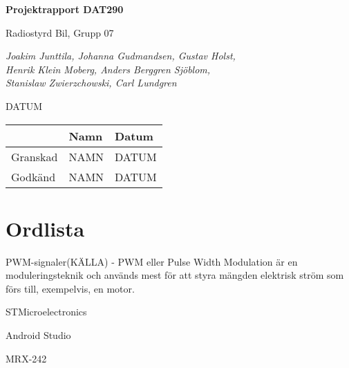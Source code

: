 \documentclass[a4paper]{article}
\begin{document}
\begin{titlepage}
\centering
{\bfseries\huge Projektrapport DAT290}

\vspace{10mm}

{\Large Radiostyrd Bil, Grupp 07}

\vspace{20mm}

{\Large \itshape{Joakim Junttila, Johanna Gudmandsen, Gustav Holst,\\Henrik Klein Moberg, Anders Berggren Sjöblom, \\[1mm] Stanislaw Zwierzchowski, Carl Lundgren}}

\vspace{10mm}

{DATUM}


\normalsize{
\begin{table}[b]
\centering
\begin{tabular}{|l|l|l|}  \hline
          & \bf Namn & \bf Datum   \\ \hline \hline
 Granskad & NAMN     & DATUM        \\ \hline
 Godkänd  & NAMN     & DATUM         \\ \hline
  \end{tabular}  
  \end{table}}
\end{titlepage}

\tableofcontents

\newpage
\section{Ordlista}
PWM-signaler(KÄLLA) - PWM eller Pulse Width Modulation är en moduleringsteknik och används mest för att styra mängden elektrisk ström som förs till, exempelvis, en motor.

STMicroelectronics

Android Studio
 
MRX-242
\end{document}
